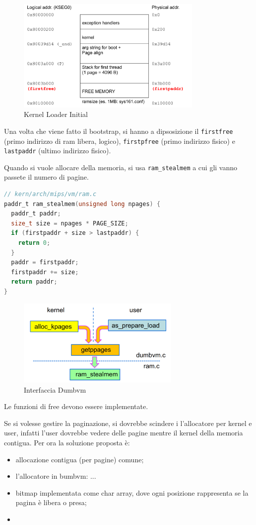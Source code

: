 \documentclass[12pt]{article}
\begin{document}
\begin{figure}[H]
  \centering
  \includegraphics[width=0.8\textwidth]{kernel-loader-initial.png}
  \caption{Kernel Loader Initial}
  \label{fig:kernel-loader-initial}
\end{figure}
Una volta che viene fatto il bootstrap, si hanno a dipsosizione il \texttt{firstfree} (primo indirizzo di ram libera, logico), \texttt{firstpfree} (primo indirizzo fisico) e \texttt{lastpaddr} (ultimo indirizzo fisico).

Quando si vuole allocare della memoria, si usa \texttt{ram\_stealmem} a cui gli vanno passete il numero di pagine.
\begin{lstlisting}[language=c]
// kern/arch/mips/vm/ram.c
paddr_t ram_stealmem(unsigned long npages) {
  paddr_t paddr;
  size_t size = npages * PAGE_SIZE;
  if (firstpaddr + size > lastpaddr) {
    return 0;
  }
  paddr = firstpaddr;
  firstpaddr += size;
  return paddr;
}
\end{lstlisting}
\begin{figure}[H]
  \centering
  \includegraphics[width=0.7\textwidth]{interfaccia-dumbvm.png}
  \caption{Interfaccia Dumbvm}
  \label{fig:interfaccia-dumbvm}
\end{figure}
Le funzioni di free devono essere implementate.


Se si volesse gestire la paginazione, si dovrebbe scindere i l'allocatore per kernel e user, infatti l'user dovrebbe vedere delle pagine mentre il kernel della memoria contigua. Per ora la soluzione proposta \`e:
\begin{itemize}
  \item allocazione contigua (per pagine) comune;
  \item l'allocatore in bumbvm: ...
  \item bitmap implementata come char array, dove ogni posizione rappresenta se la pagina \`e libera o presa;
  \item 
\end{itemize}
\end{document}
